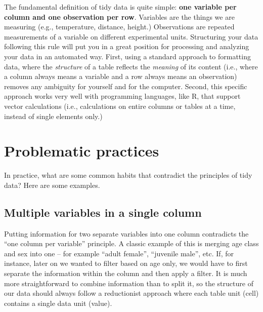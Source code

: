 \documentclass[
]{book}
\begin{document}
The fundamental definition of tidy data is quite simple: \textbf{one variable per column and one observation per row}. Variables are the things we are measuring (e.g., temperature, distance, height.) Observations are repeated measurements of a variable on different experimental units. Structuring your data following this rule will put you in a great position for processing and analyzing your data in an automated way. First, using a standard approach to formatting data, where the \emph{structure} of a table reflects the \emph{meaning} of its content (i.e., where a column always means a variable and a row always means an observation) removes any ambiguity for yourself and for the computer. Second, this specific approach works very well with programming languages, like R, that support vector calculations (i.e., calculations on entire columns or tables at a time, instead of single elements only.)

\hypertarget{problematic-practices}{%
\section{Problematic practices}\label{problematic-practices}}

In practice, what are some common habits that contradict the principles of tidy data? Here are some examples.

\hypertarget{multiple-variables-in-a-single-column}{%
\subsection{Multiple variables in a single column}\label{multiple-variables-in-a-single-column}}

Putting information for two separate variables into one column contradicts the ``one column per variable'' principle. A classic example of this is merging age class and sex into one -- for example ``adult female'', ``juvenile male'', etc. If, for instance, later on we wanted to filter based on age only, we would have to first separate the information within the column and then apply a filter. It is much more straightforward to combine information than to split it, so the structure of our data should always follow a reductionist approach where each table unit (cell) contains a single data unit (value).
\end{document}
